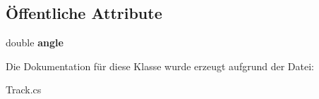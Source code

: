 \subsection*{Öffentliche Attribute}
\begin{DoxyCompactItemize}
\item 
\hypertarget{class_robot_ctrl_1_1_track_turn_a5ea004969a5701516952d1424dfa2be3}{
double {\bfseries angle}}
\label{class_robot_ctrl_1_1_track_turn_a5ea004969a5701516952d1424dfa2be3}

\end{DoxyCompactItemize}


Die Dokumentation für diese Klasse wurde erzeugt aufgrund der Datei:\begin{DoxyCompactItemize}
\item 
Track.cs\end{DoxyCompactItemize}
